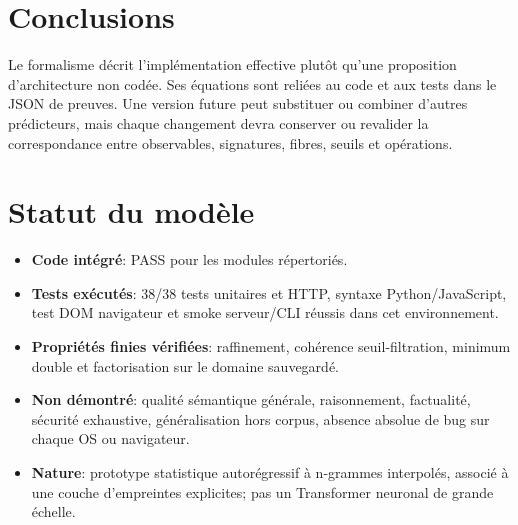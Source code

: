 \documentclass[11pt,a4paper]{article}
\begin{document}
\section{Conclusions}
Le formalisme décrit l'implémentation effective plutôt qu'une proposition d'architecture non codée. Ses équations sont reliées au code et aux tests dans le JSON de preuves. Une version future peut substituer ou combiner d'autres prédicteurs, mais chaque changement devra conserver ou revalider la correspondance entre observables, signatures, fibres, seuils et opérations.
\section{Statut du modèle}
\begin{itemize}
\item \textbf{Code intégré}: PASS pour les modules répertoriés.
\item \textbf{Tests exécutés}: 38/38 tests unitaires et HTTP, syntaxe Python/JavaScript, test DOM navigateur et smoke serveur/CLI réussis dans cet environnement.
\item \textbf{Propriétés finies vérifiées}: raffinement, cohérence seuil-filtration, minimum double et factorisation sur le domaine sauvegardé.
\item \textbf{Non démontré}: qualité sémantique générale, raisonnement, factualité, sécurité exhaustive, généralisation hors corpus, absence absolue de bug sur chaque OS ou navigateur.
\item \textbf{Nature}: prototype statistique autorégressif à n-grammes interpolés, associé à une couche d'empreintes explicites; pas un Transformer neuronal de grande échelle.
\end{itemize}
\end{document}
